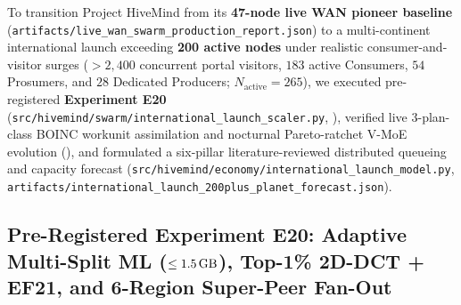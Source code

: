 \documentclass[11pt,a4paper]{article}
\begin{document}
To transition Project HiveMind from its \textbf{47-node live WAN pioneer baseline} (\texttt{artifacts/live\_wan\_swarm\_production\_report.json}) to a multi-continent international launch exceeding \textbf{200 active nodes} under realistic consumer-and-visitor surges ($>2{,}400$ concurrent portal visitors, $183$ active Consumers, $54$ Prosumers, and $28$ Dedicated Producers; $N_{\text{active}} = 265$), we executed pre-registered \textbf{Experiment E20} (\texttt{src/hivemind/swarm/international\_launch\_scaler.py}, ), verified live 3-plan-class BOINC workunit assimilation and nocturnal Pareto-ratchet V-MoE evolution (), and formulated a six-pillar literature-reviewed distributed queueing and capacity forecast (\texttt{src/hivemind/economy/international\_launch\_model.py}, \texttt{artifacts/international\_launch\_200plus\_planet\_forecast.json}).

\subsection{Pre-Registered Experiment E20: Adaptive Multi-Split ML ($\le 1.5\text{\,GB}$), Top-1\% 2D-DCT + EF21, and 6-Region Super-Peer Fan-Out}
\label{sec:e20_live_experiment}
\end{document}
